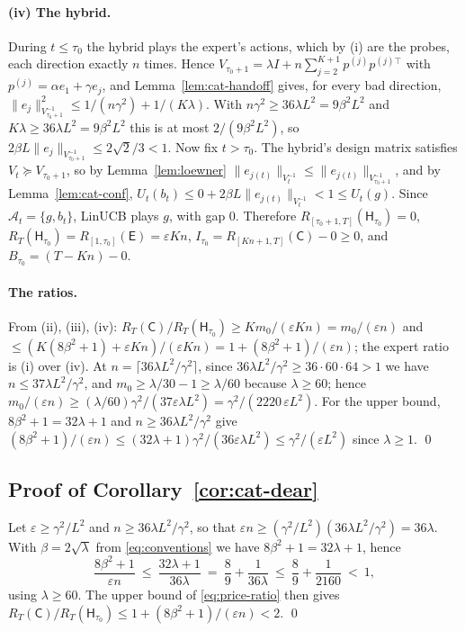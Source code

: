 \documentclass{article}
\theoremstyle{definition}
\theoremstyle{remark}
\newcommand{\eps}{\varepsilon}
\theoremstyle{remark}
\newcommand{\Cold}{\mathsf{C}}
\newcommand{\Exp}{\mathsf{E}}
\newcommand{\Hyb}{\mathsf{H}}
\begin{document}
\paragraph{(iv) The hybrid.}
During $t\le\tau_0$ the hybrid plays the expert's actions, which by (i) are
the probes, each direction exactly $n$ times. Hence
$V_{\tau_0+1}=\lambda I+n\sum_{j=2}^{K+1}p^{(j)}p^{(j)\top}$ with $p^{(j)}=\alpha e_1+\gamma e_j$,
and Lemma~\ref{lem:cat-handoff} gives, for every bad direction,
$\|e_j\|^2_{V_{\tau_0+1}^{-1}}\le1/(n\gamma^2)+1/(K\lambda)$. With $n\gamma^2\ge36\lambda L^2=9\beta^2L^2$
and $K\lambda\ge36\lambda L^2=9\beta^2L^2$ this is at most $2/(9\beta^2L^2)$, so
$2\beta L\|e_j\|_{V_{\tau_0+1}^{-1}}\le2\sqrt2/3<1$. Now fix $t>\tau_0$. The
hybrid's design matrix satisfies $V_t\succeq V_{\tau_0+1}$, so by
Lemma~\ref{lem:loewner} $\|e_{j(t)}\|_{V_t^{-1}}\le\|e_{j(t)}\|_{V_{\tau_0+1}^{-1}}$,
and by Lemma~\ref{lem:cat-conf}, $U_t(b_t)\le0+2\beta L\|e_{j(t)}\|_{V_t^{-1}}<1\le U_t(g)$.
Since $\mathcal A_t=\{g,b_t\}$, LinUCB plays $g$, with gap $0$. Therefore
$R_{[\tau_0+1,T]}(\Hyb_{\tau_0})=0$, $R_T(\Hyb_{\tau_0})=R_{[1,\tau_0]}(\Exp)=\eps Kn$,
$I_{\tau_0}=R_{[Kn+1,T]}(\Cold)-0\ge0$, and $B_{\tau_0}=(T-Kn)-0$.

\paragraph{The ratios.}
From (ii), (iii), (iv): $R_T(\Cold)/R_T(\Hyb_{\tau_0})\ge Km_0/(\eps Kn)=m_0/(\eps n)$
and $\le(K(8\beta^2+1)+\eps Kn)/(\eps Kn)=1+(8\beta^2+1)/(\eps n)$; the
expert ratio is (i) over (iv). At $n=\lceil36\lambda L^2/\gamma^2\rceil$, since
$36\lambda L^2/\gamma^2\ge36\cdot60\cdot64>1$ we have $n\le37\lambda L^2/\gamma^2$, and
$m_0\ge\lambda/30-1\ge\lambda/60$ because $\lambda\ge60$; hence
$m_0/(\eps n)\ge(\lambda/60)\gamma^2/(37\eps\lambda L^2)=\gamma^2/(2220\,\eps L^2)$. For the
upper bound, $8\beta^2+1=32\lambda+1$ and $n\ge36\lambda L^2/\gamma^2$ give
$(8\beta^2+1)/(\eps n)\le(32\lambda+1)\gamma^2/(36\eps\lambda L^2)\le \gamma^2/(\eps L^2)$
since $\lambda\ge1$. \qed

\subsection{Proof of Corollary~\ref{cor:cat-dear}}

Let $\eps\ge \gamma^2/L^2$ and $n\ge36\lambda L^2/\gamma^2$, so that
$\eps n\ge(\gamma^2/L^2)(36\lambda L^2/\gamma^2)=36\lambda$. With $\beta=2\sqrt\lambda$
from \eqref{eq:conventions} we have $8\beta^2+1=32\lambda+1$, hence
\[
\frac{8\beta^2+1}{\eps n}\ \le\ \frac{32\lambda+1}{36\lambda}
\ =\ \frac89+\frac{1}{36\lambda}\ \le\ \frac89+\frac{1}{2160}\ <\ 1 ,
\]
using $\lambda\ge60$. The upper bound of \eqref{eq:price-ratio} then gives
$R_T(\Cold)/R_T(\Hyb_{\tau_0})\le1+(8\beta^2+1)/(\eps n)<2$. \qed
\end{document}
